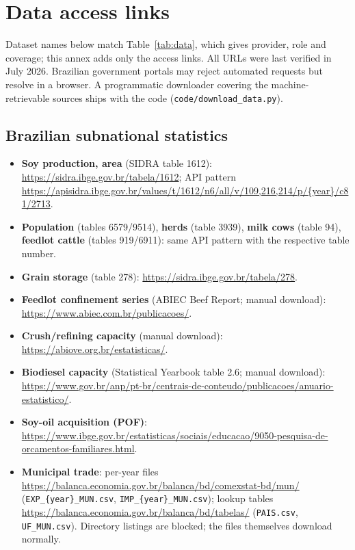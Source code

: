 
\section{Data access links}\label{app:links}

Dataset names below match Table~\ref{tab:data}, which gives provider,
role and coverage; this annex adds only the access links. All URLs were
last verified in July 2026. Brazilian government portals may reject
automated requests but resolve in a browser. A programmatic downloader
covering the machine-retrievable sources ships with the code
(\texttt{code/download\_data.py}).

\subsection*{Brazilian subnational statistics}
\begin{itemize}
  \item \textbf{Soy production, area} (SIDRA table 1612):
    \url{https://sidra.ibge.gov.br/tabela/1612}; API pattern
    \url{https://apisidra.ibge.gov.br/values/t/1612/n6/all/v/109,216,214/p/{year}/c81/2713}.
  \item \textbf{Population} (tables 6579/9514), \textbf{herds} (table
    3939), \textbf{milk cows} (table 94), \textbf{feedlot cattle}
    (tables 919/6911): same API pattern with the respective table
    number.
  \item \textbf{Grain storage} (table 278):
    \url{https://sidra.ibge.gov.br/tabela/278}.
  \item \textbf{Feedlot confinement series} (ABIEC Beef Report; manual
    download): \url{https://www.abiec.com.br/publicacoes/}.
  \item \textbf{Crush/refining capacity} (manual download):
    \url{https://abiove.org.br/estatisticas/}.
  \item \textbf{Biodiesel capacity} (Statistical Yearbook table 2.6;
    manual download):
    \url{https://www.gov.br/anp/pt-br/centrais-de-conteudo/publicacoes/anuario-estatistico/}.
  \item \textbf{Soy-oil acquisition (POF)}:
    \url{https://www.ibge.gov.br/estatisticas/sociais/educacao/9050-pesquisa-de-orcamentos-familiares.html}.
  \item \textbf{Municipal trade}: per-year files
    \url{https://balanca.economia.gov.br/balanca/bd/comexstat-bd/mun/}
    (\texttt{EXP\_\{year\}\_MUN.csv}, \texttt{IMP\_\{year\}\_MUN.csv});
    lookup tables
    \url{https://balanca.economia.gov.br/balanca/bd/tabelas/}
    (\texttt{PAIS.csv}, \texttt{UF\_MUN.csv}). Directory listings are
    blocked; the files themselves download normally.
\end{itemize}

